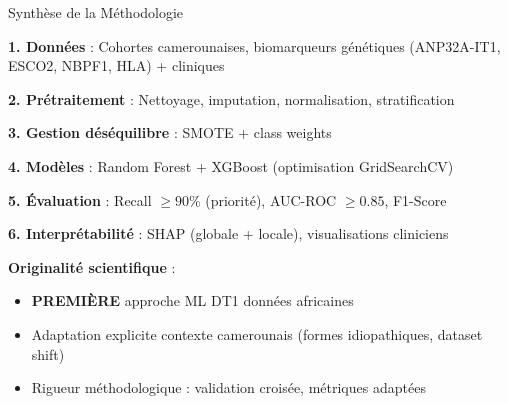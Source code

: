 \documentclass[11pt, aspectratio=169]{beamer}
\begin{document}
\begin{frame}{Synthèse de la Méthodologie}
  \begin{tcolorbox}[colback=accent2!10, title=\textbf{\small Pipeline computationnel complet}]
    \textbf{1. Données} : Cohortes camerounaises, biomarqueurs génétiques (ANP32A-IT1, ESCO2, NBPF1, HLA) + cliniques
    
    \textbf{2. Prétraitement} : Nettoyage, imputation, normalisation, stratification
    
    \textbf{3. Gestion déséquilibre} : SMOTE + class weights
    
    \textbf{4. Modèles} : Random Forest + XGBoost (optimisation GridSearchCV)
    
    \textbf{5. Évaluation} : Recall $\geq 90\%$ (priorité), AUC-ROC $\geq 0.85$, F1-Score
    
    \textbf{6. Interprétabilité} : SHAP (globale + locale), visualisations cliniciens
  \end{tcolorbox}
  
  \vspace{0.8em}
  
  \textbf{\textcolor{accent1}{Originalité scientifique}} :
  \begin{itemize}
    \item \textbf{PREMIÈRE} approche ML DT1 données africaines
    \item Adaptation explicite contexte camerounais (formes idiopathiques, dataset shift)
    \item Rigueur méthodologique : validation croisée, métriques adaptées
  \end{itemize}
\end{frame}
\end{document}
